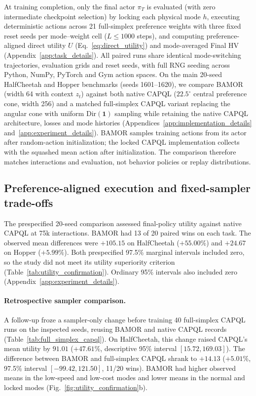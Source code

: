 At training completion, only the final actor $\pi_T$ is evaluated (with zero
intermediate checkpoint selection) by locking each physical mode $h$, executing
deterministic actions across 21 full-simplex preference weights with three
fixed reset seeds per mode--weight cell ($L \leq 1000$ steps), and computing
preference-aligned direct utility $U$ (Eq.~\eqref{eq:direct_utility}) and
mode-averaged Final HV (Appendix~\ref{app:task_details}). All paired runs share
identical mode-switching trajectories, evaluation grids and reset seeds, with
full RNG seeding across Python, NumPy, PyTorch and Gym action spaces. On the
main 20-seed HalfCheetah and Hopper benchmarks (seeds 1601--1620), we compare
BAMOR (width 64 with context $z_t$) against both native CAPQL ($22.5^\circ$
central preference cone, width 256) and a matched full-simplex CAPQL variant
replacing the angular cone with uniform $\mathrm{Dir}(\mathbf{1})$ sampling
while retaining the native CAPQL architecture, losses and mode histories
(Appendices~\ref{app:implementation_details} and~\ref{app:experiment_details}).
BAMOR samples training actions from its actor after random-action
initialization; the locked CAPQL implementation collects with the squashed
mean action after initialization. The comparison therefore matches
interactions and evaluation, not behavior policies or replay distributions.

\subsection{Preference-aligned execution and fixed-sampler trade-offs}
\label{sec:utility_confirmation}

The prespecified 20-seed comparison assessed final-policy utility against
native CAPQL at 75k interactions. BAMOR had 13 of 20 paired wins on each task.
The observed mean differences were $+105.15$ on HalfCheetah ($+55.00\%$) and
$+24.67$ on Hopper ($+5.99\%$). Both prespecified 97.5\% marginal intervals
included zero, so the study did not meet its utility superiority criterion
(Table~\ref{tab:utility_confirmation}). Ordinary 95\% intervals also
included zero (Appendix~\ref{app:experiment_details}).



\paragraph{Retrospective sampler comparison.}
A follow-up froze a sampler-only change before training 40 full-simplex
CAPQL runs on the inspected seeds, reusing BAMOR and native CAPQL records
(Table~\ref{tab:full_simplex_capql}).
On HalfCheetah, this change raised CAPQL's mean utility by $91.01$
($+47.61\%$, descriptive 95\% interval $[15.72,169.03]$).
The difference between BAMOR and full-simplex CAPQL shrank to $+14.13$
($+5.01\%$, 97.5\% interval $[-99.42,121.50]$, 11/20 wins).
BAMOR had higher observed means in the low-speed and low-cost modes and
lower means in the normal and locked modes (Fig.~\ref{fig:utility_confirmation}b).

